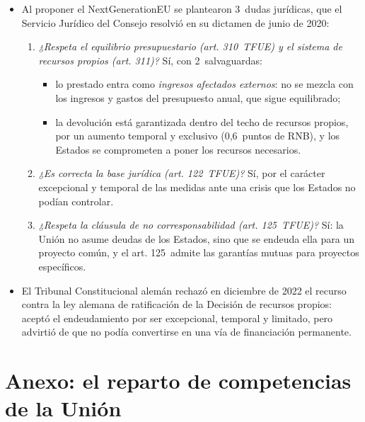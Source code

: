 \documentclass[11pt]{article}
\begin{document}
\begin{itemize}
\item Al proponer el NextGenerationEU se plantearon 3~dudas jurídicas, que el Servicio Jurídico del Consejo resolvió en su dictamen de junio de 2020\nocite{Consejo2020DictamenJuridico}:
  \begin{enumerate}
  \item \emph{¿Respeta el equilibrio presupuestario (art. 310~TFUE) y el sistema de recursos propios (art. 311)?} Sí, con 2~salvaguardas:
    \begin{itemize}
    \item lo prestado entra como \emph{ingresos afectados externos}: no se mezcla con los ingresos y gastos del presupuesto anual, que sigue equilibrado;
    \item la devolución está garantizada dentro del techo de recursos propios, por un aumento temporal y exclusivo (0,6~puntos de RNB), y los Estados se comprometen a poner los recursos necesarios.
    \end{itemize}
  \item \emph{¿Es correcta la base jurídica (art. 122~TFUE)?} Sí, por el carácter excepcional y temporal de las medidas ante una crisis que los Estados no podían controlar.
  \item \emph{¿Respeta la cláusula de no corresponsabilidad (art. 125~TFUE)?} Sí: la Unión no asume deudas de los Estados, sino que se endeuda ella para un proyecto común, y el art. 125~admite las garantías mutuas para proyectos específicos.
  \end{enumerate}
\item El Tribunal Constitucional alemán rechazó en diciembre de 2022 el recurso contra la ley alemana de ratificación de la Decisión de recursos propios: aceptó el endeudamiento por ser excepcional, temporal y limitado, pero advirtió de que no podía convertirse en una vía de financiación permanente\nocite{BVerfG2022NGEU}.
\end{itemize}

\section{Anexo: el reparto de competencias\cortetitulo{} de la Unión}\label{anexo:competencias}
\end{document}
